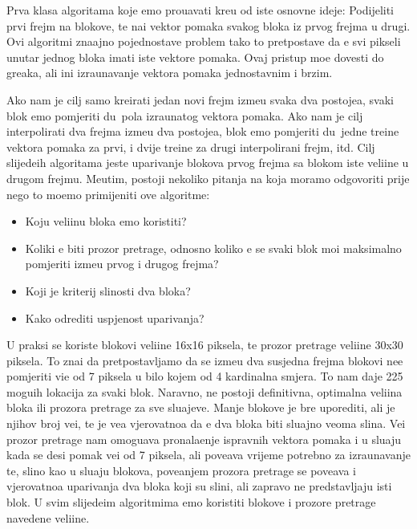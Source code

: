 Prva klasa algoritama koje \cj emo prou\ch avati kre\cj u od iste osnovne ideje: Podijeliti prvi frejm na blokove, te na\cj i vektor pomaka svakog bloka iz prvog frejma u drugi. Ovi algoritmi zna\ch ajno pojednostave problem tako \sh to
pretpostave da \cj e svi pikseli unutar jednog bloka imati iste vektore pomaka. Ovaj pristup mo\zh e dovesti do gre\sh aka, ali \ch ini izra\ch unavanje vektora pomaka jednostavnim i brzim.

Ako nam je cilj samo kreirati jedan novi frejm izme\dj u svaka dva postoje\cj a, svaki blok \cj emo pomjeriti du\zh\ pola izra\ch unatog vektora pomaka. Ako nam je cilj interpolirati dva frejma izme\dj u dva postoje\cj a, blok \cj emo 
pomjeriti du\zh\ jedne tre\cj ine vektora pomaka za prvi, i dvije tre\cj ine za drugi interpolirani frejm, itd. Cilj slijede\cj ih algoritama jeste uparivanje blokova prvog frejma sa blokom iste veli\ch ine u drugom frejmu. Me\dj utim,
postoji nekoliko pitanja na koja moramo odgovoriti prije nego \sh to mo\zh emo primijeniti ove algoritme:

\begin{itemize}
	\item Koju veli\ch inu bloka \cj emo koristiti?
	\item Koliki \cj e biti prozor pretrage, odnosno koliko \cj e se svaki blok mo\cj i maksimalno pomjeriti izme\dj u prvog i drugog frejma?
	\item Koji je kriterij sli\ch nosti dva bloka?
	\item Kako odrediti uspje\sh nost uparivanja?
\end{itemize}

U praksi se koriste blokovi veli\ch ine 16x16 piksela, te prozor pretrage veli\ch ine 30x30 piksela. To zna\ch i da pretpostavljamo da se izme\dj u dva susjedna frejma blokovi ne\cj e pomjeriti vi\sh e od 7 piksela u bilo kojem od 4
kardinalna smjera. To nam daje 225 mogu\cj ih lokacija za svaki blok. Naravno, ne postoji definitivna, optimalna veli\ch ina bloka ili prozora pretrage za sve slu\ch ajeve. Manje blokove je br\zh e uporediti, ali je njihov broj ve\cj i,
te je ve\cj a vjerovatno\cj a da \cj e dva bloka biti slu\ch ajno veoma sli\ch na. Ve\cj i prozor pretrage nam omogu\cj ava pronala\zh enje ispravnih vektora pomaka i u slu\ch aju kada se desi pomak ve\cj i od 7 piksela, ali
pove\cj ava vrijeme potrebno za izra\ch unavanje te, sli\ch no kao u slu\ch aju blokova, pove\cj anjem prozora pretrage se pove\cj ava i vjerovatno\cj a uparivanja dva bloka koji su sli\ch ni, ali zapravo ne
predstavljaju isti blok. U svim slijede\cj im algoritmima \cj emo koristiti blokove i prozore pretrage navedene veli\ch ine.

